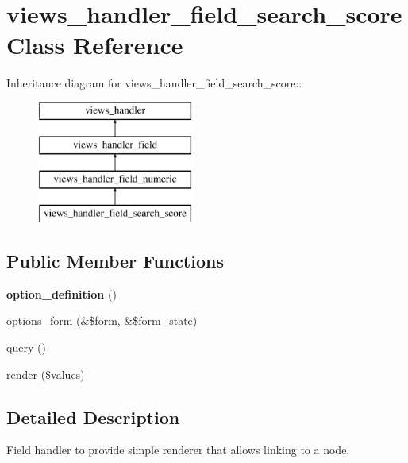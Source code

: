 \hypertarget{classviews__handler__field__search__score}{
\section{views\_\-handler\_\-field\_\-search\_\-score Class Reference}
\label{classviews__handler__field__search__score}
}
Inheritance diagram for views\_\-handler\_\-field\_\-search\_\-score::\begin{figure}[H]
\begin{center}
\leavevmode
\includegraphics[height=4cm]{classviews__handler__field__search__score}
\end{center}
\end{figure}
\subsection*{Public Member Functions}
\begin{DoxyCompactItemize}
\item 
\hypertarget{classviews__handler__field__search__score_aac88046a858aad74c178cd019b2f236b}{
{\bfseries option\_\-definition} ()}
\label{classviews__handler__field__search__score_aac88046a858aad74c178cd019b2f236b}

\item 
\hyperlink{classviews__handler__field__search__score_ad3bc7dfcc4859869b75b371c33380abb}{options\_\-form} (\&\$form, \&\$form\_\-state)
\item 
\hyperlink{classviews__handler__field__search__score_afda75fb726345ee91401d2f79ad2d313}{query} ()
\item 
\hyperlink{classviews__handler__field__search__score_a80a58d69b8a6c7f57da022e88f90e32d}{render} (\$values)
\end{DoxyCompactItemize}


\subsection{Detailed Description}
Field handler to provide simple renderer that allows linking to a node. 


